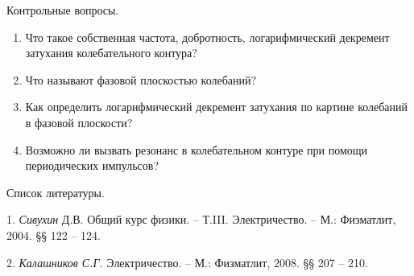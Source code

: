 Контрольные вопросы.

\begin{enumerate}
\def\labelenumi{\arabic{enumi}.}
\item
  Что такое собственная частота, добротность, логарифмический декремент
  затухания колебательного контура?
\item
  Что называют фазовой плоскостью колебаний?
\item
  Как определить логарифмический декремент затухания по картине
  колебаний в фазовой плоскости?
\item
  Возможно ли вызвать резонанс в колебательном контуре при помощи
  периодических импульсов?
\end{enumerate}

Список литературы.

1. \emph{Сивухин} Д.В. Общий курс физики. -- Т.III. Электричество. --
М.: Физматлит, 2004. §§ 122 -- 124.

2. \emph{Калашников С.Г.} Электричество. -- М.: Физматлит, 2008. §§ 207
-- 210.

